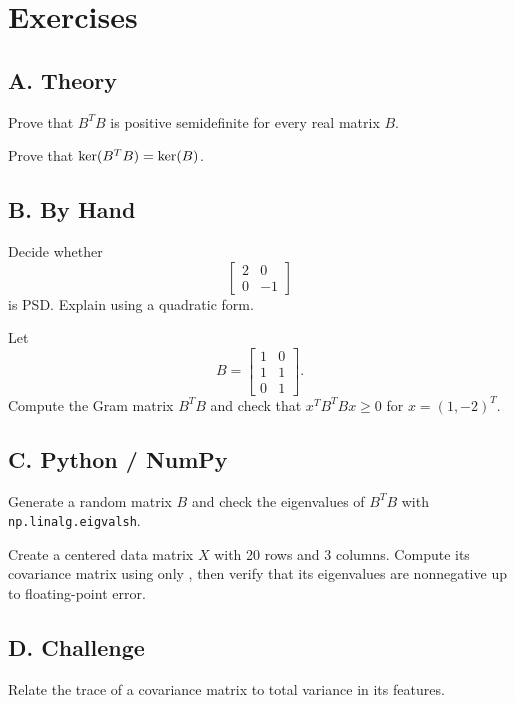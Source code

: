 \section*{Exercises}

\subsection*{A. Theory}

\begin{exercise}
Prove that $B^TB$ is positive semidefinite for every real matrix $B$.
\end{exercise}

\begin{exercise}
Prove that $\operatorname{ker}(B^TB)=\operatorname{ker}(B)$.
\end{exercise}

\subsection*{B. By Hand}

\begin{exercise}
Decide whether
\[
  \begin{bmatrix}2&0\\0&-1\end{bmatrix}
\]
is PSD. Explain using a quadratic form.
\end{exercise}

\begin{exercise}
Let
\[
  B=\begin{bmatrix}1&0\\1&1\\0&1\end{bmatrix}.
\]
Compute the Gram matrix $B^TB$ and check that $x^TB^TBx\geq 0$ for
$x=(1,-2)^T$.
\end{exercise}

\subsection*{C. Python / NumPy}

\begin{exercise}
Generate a random matrix $B$ and check the eigenvalues of $B^TB$ with
\texttt{np.linalg.eigvalsh}.
\end{exercise}

\begin{exercise}
Create a centered data matrix $X$ with 20 rows and 3 columns. Compute its
covariance matrix using only \NumPy, then verify that its eigenvalues are
nonnegative up to floating-point error.
\end{exercise}

\subsection*{D. Challenge}

\begin{exercise}
Relate the trace of a covariance matrix to total variance in its features.
\end{exercise}
